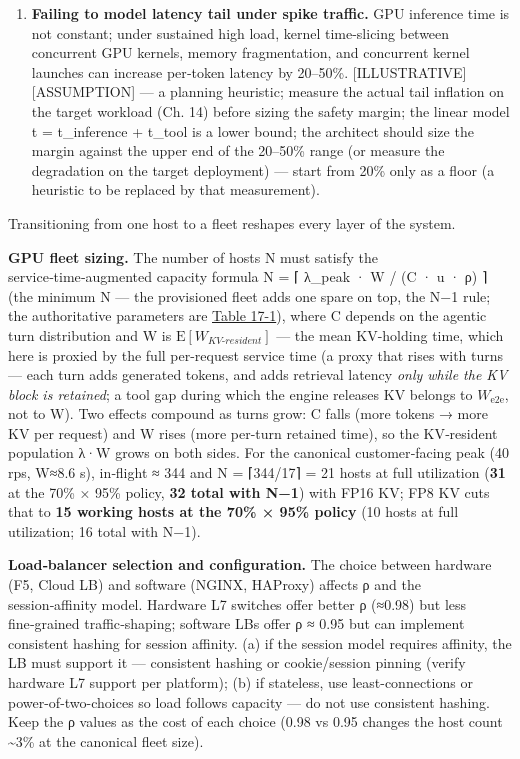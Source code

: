 \begin{enumerate}
\item
  \textbf{Failing to model latency tail under spike traffic.} GPU
  inference time is not constant; under sustained high load, kernel
  time-slicing between concurrent GPU kernels, memory fragmentation, and
  concurrent kernel launches can increase per‑token latency by 20--50\%.
  \mbox{{[}ILLUSTRATIVE{]}}\hspace{0pt}\mbox{{[}ASSUMPTION{]}} --- a planning heuristic; measure
  the actual tail inflation on the target workload (Ch. 14) before
  sizing the safety margin; the linear model t = t\_inference + t\_tool
  is a lower bound; the architect should size the margin against the
  upper end of the 20--50\% range (or measure the degradation on the
  target deployment) --- start from 20\% only as a floor (a heuristic to
  be replaced by that measurement).
\end{enumerate}

\label{architecture-consequence}


Transitioning from one host to a fleet reshapes every layer of the
system.

\textbf{GPU fleet sizing.} The number of hosts N must satisfy the
service‑time‑augmented capacity formula N = ⌈ λ\_peak · W / (C · u · ρ)
⌉ (the minimum N --- the provisioned fleet adds one spare on top, the
N−1 rule; the authoritative parameters are \hyperref[tab:17.1]{Table 17-1}), where C depends
on the agentic turn distribution and W is
\(\mathrm{E}[W_{KV\text{-}resident}]\) --- the mean KV-holding time,
which here is proxied by the full per-request service time (a proxy that
rises with turns --- each turn adds generated tokens, and adds retrieval
latency \emph{only while the KV block is retained}; a tool gap during
which the engine releases KV belongs to \(W_{\mathrm{e2e}}\), not to W).
Two effects compound as turns grow: C falls (more tokens → more KV per
request) and W rises (more per-turn retained time), so the KV‑resident
population λ·W grows on both sides. For the canonical customer‑facing
peak (40 rps, W≈8.6 s), in‑flight ≈ 344 and N = ⌈344/17⌉ = 21 hosts at
full utilization (\textbf{31} at the 70\% × 95\% policy, \textbf{32
total with N−1}) with FP16 KV; FP8 KV cuts that to \textbf{15 working
hosts at the 70\% × 95\% policy} (10 hosts at full utilization; 16 total
with N−1).

\textbf{Load‑balancer selection and configuration.} The choice between
hardware (F5, Cloud LB) and software (NGINX, HAProxy) affects ρ and the
session‑affinity model. Hardware L7 switches offer better ρ (≈0.98) but
less fine‑grained traffic‑shaping; software LBs offer ρ ≈ 0.95 but can
implement consistent hashing for session affinity. (a) if the session
model requires affinity, the LB must support it --- consistent hashing
or cookie/session pinning (verify hardware L7 support per platform); (b)
if stateless, use least-connections or power-of-two-choices so load
follows capacity --- do not use consistent hashing. Keep the ρ values as
the cost of each choice (0.98 vs 0.95 changes the host count
\textasciitilde3\% at the canonical fleet size).

